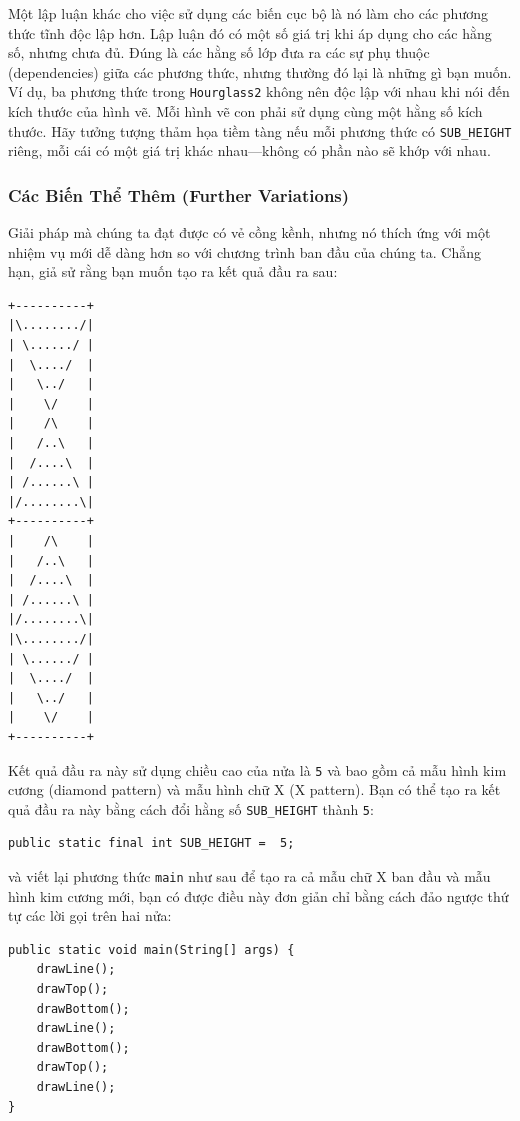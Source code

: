 Một lập luận khác cho việc sử dụng các biến cục bộ là nó làm cho các
phương thức tĩnh độc lập hơn. Lập luận đó có một số giá trị khi áp dụng
cho các hằng số, nhưng chưa đủ. Đúng là các hằng số lớp đưa ra các sự
phụ thuộc (dependencies) giữa các phương thức, nhưng thường đó lại là
những gì bạn muốn. Ví dụ, ba phương thức trong \texttt{Hourglass2} không
nên độc lập với nhau khi nói đến kích thước của hình vẽ. Mỗi hình vẽ con
phải sử dụng cùng một hằng số kích thước. Hãy tưởng tượng thảm họa tiềm
tàng nếu mỗi phương thức có \texttt{SUB\_HEIGHT} riêng, mỗi cái có một
giá trị khác nhau---không có phần nào sẽ khớp với nhau.

\subsubsection{Các Biến Thể Thêm (Further
Variations)}\label{cuxe1c-biux1ebfn-thux1ec3-thuxeam-further-variations}

Giải pháp mà chúng ta đạt được có vẻ cồng kềnh, nhưng nó thích ứng với
một nhiệm vụ mới dễ dàng hơn so với chương trình ban đầu của chúng ta.
Chẳng hạn, giả sử rằng bạn muốn tạo ra kết quả đầu ra sau:

\begin{verbatim}
+----------+ 
|\......../| 
| \....../ | 
|  \..../  | 
|   \../   | 
|    \/    | 
|    /\    | 
|   /..\   | 
|  /....\  | 
| /......\ | 
|/........\| 
+----------+ 
|    /\    | 
|   /..\   | 
|  /....\  | 
| /......\ | 
|/........\| 
|\......../| 
| \....../ | 
|  \..../  | 
|   \../   | 
|    \/    | 
+----------+
\end{verbatim}

Kết quả đầu ra này sử dụng chiều cao của nửa là \texttt{5} và bao gồm cả
mẫu hình kim cương (diamond pattern) và mẫu hình chữ X (X pattern). Bạn
có thể tạo ra kết quả đầu ra này bằng cách đổi hằng số
\texttt{SUB\_HEIGHT} thành \texttt{5}:

\begin{verbatim}
public static final int SUB_HEIGHT =  5;
\end{verbatim}

và viết lại phương thức \texttt{main} như sau để tạo ra cả mẫu chữ X ban
đầu và mẫu hình kim cương mới, bạn có được điều này đơn giản chỉ bằng
cách đảo ngược thứ tự các lời gọi trên hai nửa:

\begin{verbatim}
public static void main(String[] args) {
    drawLine();
    drawTop();
    drawBottom();
    drawLine();
    drawBottom();
    drawTop();
    drawLine();
}
\end{verbatim}

